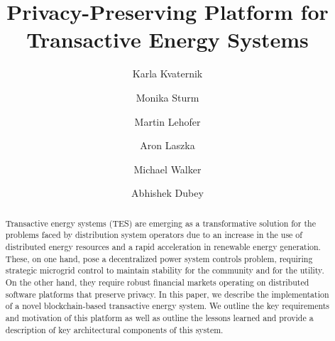 \documentclass[sigplan]{acmart}
\begin{document}
\title{Privacy-Preserving Platform for Transactive Energy Systems}


\author{Karla Kvaternik}

\author{Monika Sturm}


\author{Martin Lehofer}

\author{Aron Laszka}

\author{Michael Walker}

\author{Abhishek Dubey}





\renewcommand{\shortauthors}{K. Kvaternik et al.}





\begin{abstract}
Transactive energy systems (TES) are emerging as a transformative solution for the problems faced by distribution system operators due to an increase in the use of distributed energy resources and a rapid acceleration in renewable energy generation. These, on one hand, pose a decentralized power system controls problem, requiring strategic microgrid control to maintain stability for the community and for the utility. On the other hand, they require robust financial markets operating on distributed software platforms that preserve privacy. In this paper, we describe the implementation of a novel blockchain-based transactive energy system. We outline the key requirements and motivation of this platform as well as outline the lessons learned and provide a description of key architectural components of this system.
\end{abstract}


\end{document}
